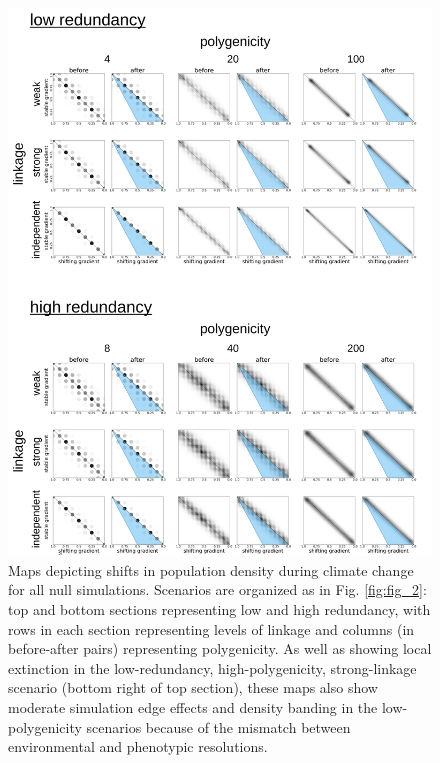\documentclass[9pt,twocolumn,twoside,lineno]{pnas-new}
\begin{document}
\begin{figure}
\centering
\includegraphics[width=.8\linewidth]{pub/figs_and_stats/FIG_S3_phenotypic_shift_null.jpg}
    \caption{Maps depicting shifts in population density during climate change for all null simulations. Scenarios are organized as in Fig. \ref{fig:fig_2}: top and bottom sections representing low and high redundancy, with rows in each section representing levels of linkage and columns (in before-after pairs) representing polygenicity. As well as showing local extinction in the low-redundancy, high-polygenicity, strong-linkage scenario (bottom right of top section), these maps also show moderate simulation edge effects and density banding in the low-polygenicity scenarios because of the mismatch between environmental and phenotypic resolutions.}
\label{fig:fig_s3}
\end{figure}
\end{document}

